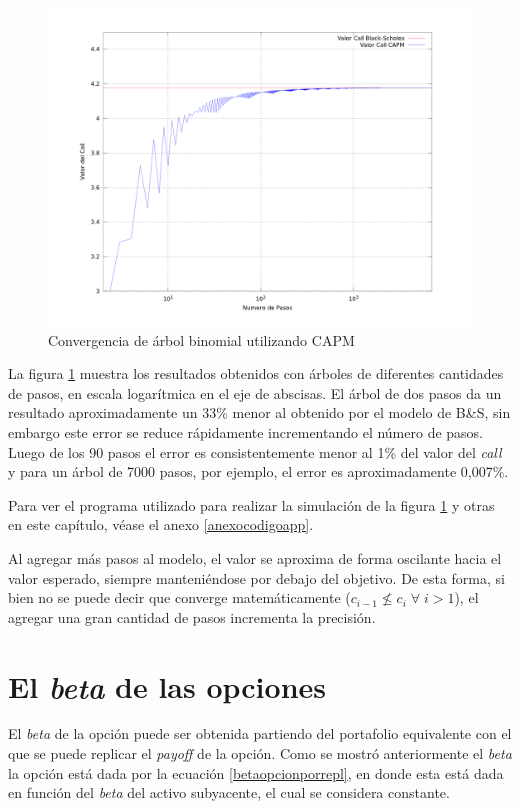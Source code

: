 \begin{figure}[H]
\centering
\includegraphics[width=1\textwidth]{Images/convergencia.png}
\caption{Convergencia de árbol binomial utilizando CAPM}
\label{fig:convergencia}
\end{figure}

La figura \ref{fig:convergencia} muestra los resultados obtenidos con árboles de diferentes cantidades de pasos, en escala logarítmica en el eje de abscisas. El árbol de dos pasos da un resultado aproximadamente un 33\% menor al obtenido por el modelo de B\&S, sin embargo este error se reduce rápidamente incrementando el número de pasos. Luego de los 90 pasos el error es consistentemente menor al 1\% del valor del \textit{call} y para un árbol de 7000 pasos, por ejemplo, el error es aproximadamente 0,007\%.

Para ver el programa utilizado para realizar la simulación de la figura \ref{fig:convergencia} y otras en este capítulo, véase el anexo \ref{anexocodigoapp}.

Al agregar más pasos al modelo, el valor se aproxima de forma oscilante hacia el valor esperado, siempre manteniéndose por debajo del objetivo. De esta forma, si bien no se puede decir que converge matemáticamente ($c_{i-1} \nleq c_i \; \forall \; i > 1$), el agregar una gran cantidad de pasos incrementa la precisión.


\section{El \textit{beta} de las opciones}

El \textit{beta} de la opción puede ser obtenida partiendo del portafolio equivalente con el que se puede replicar el \textit{payoff} de la opción. Como se mostró anteriormente el \textit{beta} la opción está dada por la ecuación \eqref{betaopcionporrepl}, en donde esta está dada en función del \textit{beta} del activo subyacente, el cual se considera constante.

